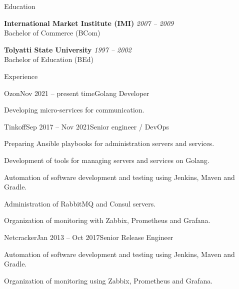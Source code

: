 \documentclass{resume} %
\begin{document}

\begin{rSection}{Education}

{\bf International Market Institute (IMI)} \hfill {{\em 2007 -- 2009\/} \\
Bachelor of Commerce (BCom)
}

{\bf Tolyatti State University} \hfill {{\em 1997 -- 2002\/} \\
Bachelor of Education (BEd)
}

\end{rSection}


\begin{rSection}{Experience}

\begin{rSubsection}{Ozon}{Nov 2021 -- present time}{Golang Developer}{}
    \item Developing micro-services for communication.
\end{rSubsection}

\begin{rSubsection}{Tinkoff}{Sep 2017 -- Nov 2021}{Senior engineer / DevOps}{}
    \item Preparing Ansible playbooks for administration servers and services.
    \item Development of tools for managing servers and services on Golang.
    \item Automation of software development and testing using Jenkins, Maven and Gradle.
    \item Administration of RabbitMQ and Consul servers.
    \item Organization of monitoring with Zabbix, Prometheus and Grafana.
\end{rSubsection}

\begin{rSubsection}{Netcracker}{Jan 2013 -- Oct 2017}{Senior Release Engineer}{}
    \item Automation of software development and testing using Jenkins, Maven and Gradle.
    \item Organization of monitoring using Zabbix, Prometheus and Grafana.
\end{rSubsection}


\end{rSection}
\end{document}

